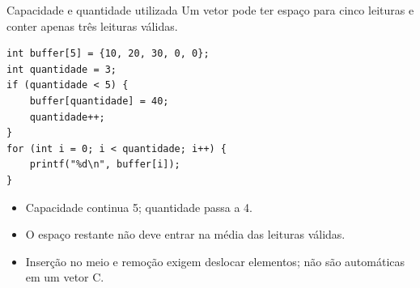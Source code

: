 \begin{frame}[fragile]{Capacidade e quantidade utilizada}
Um vetor pode ter espaço para cinco leituras e conter apenas três leituras válidas.
\begin{lstlisting}
int buffer[5] = {10, 20, 30, 0, 0};
int quantidade = 3;
if (quantidade < 5) {
    buffer[quantidade] = 40;
    quantidade++;
}
for (int i = 0; i < quantidade; i++) {
    printf("%d\n", buffer[i]);
}
\end{lstlisting}
\begin{itemize}
\item Capacidade continua 5; quantidade passa a 4.
\item O espaço restante não deve entrar na média das leituras válidas.
\item Inserção no meio e remoção exigem deslocar elementos; não são automáticas em um vetor C.
\end{itemize}
\end{frame}
